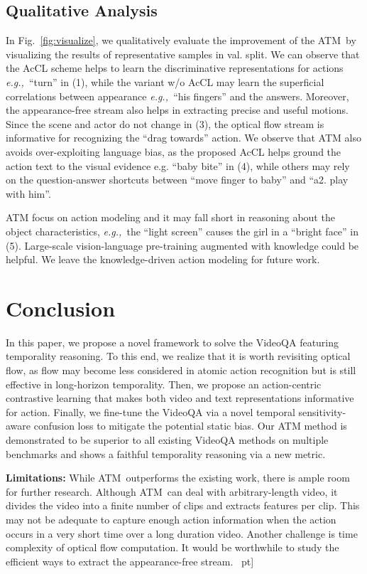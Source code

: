 \documentclass[sigconf]{acmart}
\newcommand{\methodname}{ATM~}
\newcommand{\eg}{\emph{e.g.,~}}
\begin{document}
\subsection{Qualitative Analysis}

In Fig.~\ref{fig:visualize}, we qualitatively evaluate the improvement of the \methodname by visualizing the results of representative samples in val. split. We can observe that the AcCL scheme helps to learn the discriminative representations for actions \eg ``turn'' in (1), while the variant w/o AcCL may learn the superficial correlations between appearance \eg ``his fingers'' and the answers. Moreover, the appearance-free stream also helps in extracting precise and useful motions. Since the scene and actor do not change in (3), the optical flow stream is informative for recognizing the ``drag towards'' action. We observe that ATM also avoids over-exploiting language bias, as the proposed AcCL helps ground the action text to the visual evidence e.g. ``baby bite'' in (4), while others may rely on the question-answer shortcuts between ``move finger to baby'' and ``a2. play with him''.

ATM focus on action modeling and it may fall short in reasoning about the object characteristics, \eg the ``light screen'' causes the girl in a ``bright face'' in (5).
Large-scale vision-language pre-training augmented with knowledge could be helpful. We leave the knowledge-driven action modeling for future work.
 \section{Conclusion}

In this paper, we propose a novel framework to solve the VideoQA featuring temporality reasoning.
To this end, we realize that it is worth revisiting optical flow, as flow may become less considered in atomic action recognition but is still effective in long-horizon temporality. Then, we propose an action-centric contrastive learning that makes both video and text representations informative for action.
Finally, we fine-tune the VideoQA via a novel temporal sensitivity-aware confusion loss to mitigate the potential static bias.
Our ATM method is demonstrated to be superior to all existing VideoQA methods on multiple benchmarks and shows a faithful temporality reasoning via a new metric. 

\textbf{Limitations:}
While \methodname outperforms the existing work, there is ample room for further research. 
Although \methodname can deal with arbitrary-length video, it divides the video into a finite number of clips and extracts features per clip. This may not be adequate to capture enough action information when the action occurs in a very short time over a long duration video. 
Another challenge is time complexity of optical flow computation. It would be worthwhile to study the efficient ways to extract the appearance-free stream.  
~\0pt]
\end{document}
